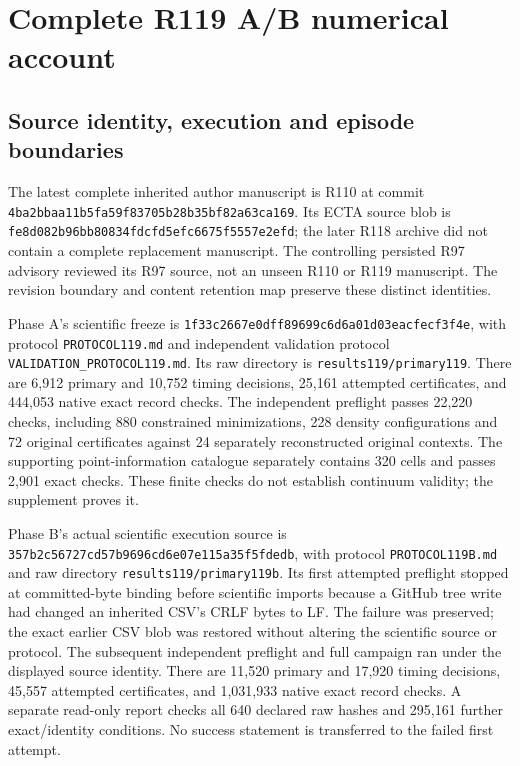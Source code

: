 \section{Complete R119 A/B numerical account}
\label{sec:development119ab}

\subsection{Source identity, execution and episode boundaries}
The latest complete inherited author manuscript is R110 at commit
\nolinkurl{4ba2bbaa11b5fa59f83705b28b35bf82a63ca169}.  Its ECTA source
blob is \nolinkurl{fe8d082b96bb80834fdcfd5efc6675f5557e2efd}; the later
R118 archive did not contain a complete replacement manuscript.  The
controlling persisted R97 advisory reviewed its R97 source, not an
unseen R110 or R119 manuscript.  The revision boundary and content
retention map preserve these distinct identities.

Phase A's scientific freeze is
\nolinkurl{1f33c2667e0dff89699c6d6a01d03eacfecf3f4e}, with protocol
\nolinkurl{PROTOCOL119.md} and independent validation protocol
\nolinkurl{VALIDATION\_PROTOCOL119.md}.  Its raw directory is
\nolinkurl{results119/primary119}.  There are 6,912 primary and 10,752
timing decisions, 25,161 attempted certificates, and 444,053 native exact
record checks.  The independent preflight passes 22,220 checks, including
880 constrained minimizations, 228 density configurations and 72 original
certificates against 24 separately reconstructed original contexts.
The supporting point-information catalogue separately contains 320 cells
and passes 2,901 exact checks.  These finite checks do not establish
continuum validity; the supplement proves it.

Phase B's actual scientific execution source is
\nolinkurl{357b2c56727cd57b9696cd6e07e115a35f5fdedb}, with protocol
\nolinkurl{PROTOCOL119B.md} and raw directory
\nolinkurl{results119/primary119b}.  Its first attempted preflight stopped
at committed-byte binding before scientific imports because a GitHub
tree write had changed an inherited CSV's CRLF bytes to LF.  The failure
was preserved; the exact earlier CSV blob was restored without altering
the scientific source or protocol.  The subsequent independent preflight
and full campaign ran under the displayed source identity.  There are
11,520 primary and 17,920 timing decisions, 45,557 attempted certificates,
and 1,031,933 native exact record checks.  A separate read-only report
checks all 640 declared raw hashes and 295,161 further exact/identity
conditions.  No success statement is transferred to the failed first
attempt.

